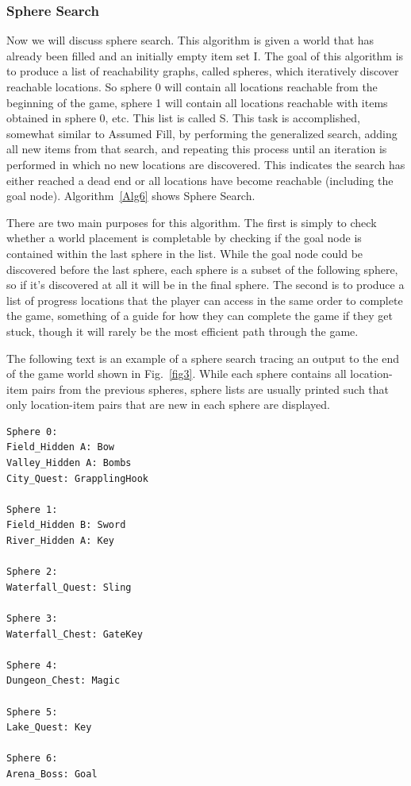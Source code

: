 \documentclass{ieeeaccess}
\begin{document}
\subsubsection{Sphere Search}
Now we will discuss sphere search. This algorithm is given a world that has already been filled
and an initially empty item set I. The goal of this algorithm is to produce a list of
reachability graphs, called spheres, which iteratively discover reachable locations. 
So sphere 0 will contain all locations reachable from the beginning of the game,
sphere 1 will contain all locations reachable with items obtained in sphere 0, etc.
This list is called S. This task is accomplished, somewhat similar to Assumed Fill, 
by performing the generalized search, adding all new items from that search, and repeating this
process until an iteration is performed in which no new locations are discovered. This 
indicates the search has either reached a dead end or all locations have become reachable
(including the goal node). Algorithm~\ref{Alg6} shows Sphere Search.

There are two main purposes for this algorithm. The first is simply to check whether a world
placement is completable by checking if the goal node is contained within the last sphere in
the list. While the goal node could be discovered before the last sphere, each sphere is a
subset of the following sphere, so if it's discovered at all it will be in the final sphere.
The second is to produce a list of progress locations that the player can access in the same
order to complete the game, something of a guide for how they can complete the game if they get
stuck, though it will rarely be the most efficient path through the game.

The following text is an example of a sphere search tracing an output to the end of the game
world shown in Fig.~\ref{fig3}. While each sphere contains all location-item pairs from the
previous spheres, sphere lists are usually printed such that only location-item pairs that are
new in each sphere are displayed.

\begin{verbatim}
Sphere 0:
Field_Hidden A: Bow
Valley_Hidden A: Bombs
City_Quest: GrapplingHook

Sphere 1:
Field_Hidden B: Sword
River_Hidden A: Key

Sphere 2:
Waterfall_Quest: Sling

Sphere 3:
Waterfall_Chest: GateKey

Sphere 4:
Dungeon_Chest: Magic

Sphere 5:
Lake_Quest: Key

Sphere 6:
Arena_Boss: Goal
\end{verbatim}
\end{document}
